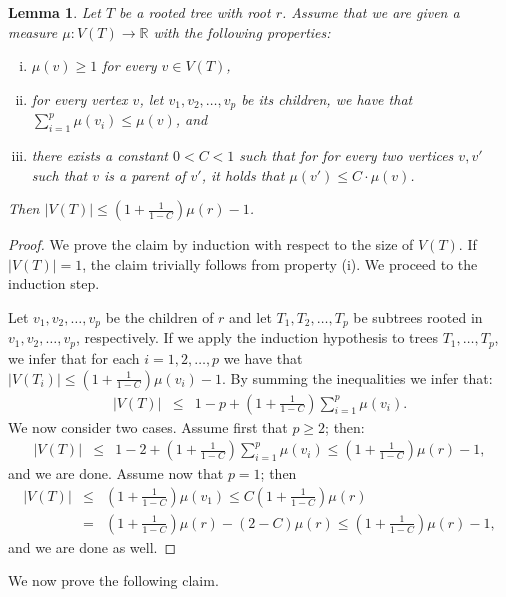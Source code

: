 \documentclass[a4paper,11pt]{article}
\newtheorem{lemma}{Lemma}[section]
\theoremstyle{definition}
\theoremstyle{remark}
\newcommand{\R}{\mathbb{R}}
\begin{document}
\begin{lemma}
  \label{lemma:bounded-tree}
  Let $T$ be a rooted tree with root $r$.  Assume that we are given a
  measure $\mu:V(T)\to \R$ with the following properties:
  \begin{enumerate}[(i)]
  \item[(i)] $\mu(v)\geq 1$ for every $v\in V(T)$,
  \item[(ii)] for every vertex $v$, let $v_1,v_2,\ldots,v_p$ be its
    children, we have that $\sum_{i=1}^p \mu(v_i)\leq \mu(v)$, and
  \item[(iii)] there exists a constant $0<C<1$ such that for for every
    two vertices $v,v'$ such that $v$ is a parent of $v'$, it holds
    that $\mu(v')\leq C\cdot \mu(v)$.
  \end{enumerate}
  Then $|V(T)|\leq \left(1+\frac{1}{1-C}\right)\mu(r)-1$.
\end{lemma}
\begin{proof}
  We prove the claim by induction with respect to the size of $V(T)$.
  If $|V(T)|=1$, the claim trivially follows from property (i).  We
  proceed to the induction step.
  
  Let $v_1,v_2,\ldots,v_p$ be the children of $r$ and let
  $T_1,T_2,\ldots,T_p$ be subtrees rooted in $v_1,v_2,\ldots,v_p$,
  respectively.  If we apply the induction hypothesis to trees
  $T_1,\ldots,T_p$, we infer that for each $i=1,2,\ldots,p$ we have
  that $|V(T_i)| \leq \left(1+\frac{1}{1-C}\right)\mu(v_i)-1$.  By
  summing the inequalities we infer that:
  \begin{eqnarray*}
    |V(T)|& \leq & 1-p+\left(1+\frac{1}{1-C}\right)\sum_{i=1}^p \mu(v_i).
  \end{eqnarray*}
  We now consider two cases.  Assume first that $p\geq 2$; then:
  \begin{eqnarray*}
    |V(T)|& \leq & 1-2+\left(1+\frac{1}{1-C}\right)\sum_{i=1}^p \mu(v_i)\leq
    \left(1+\frac{1}{1-C}\right)\mu(r)-1,
  \end{eqnarray*}
  and we are done.  Assume now that $p=1$; then
  \begin{eqnarray*}
    |V(T)| & \leq & \left(1+\frac{1}{1-C}\right)\mu(v_1) \leq
    C\left(1+\frac{1}{1-C}\right)\mu(r)\\
    & = & \left(1+\frac{1}{1-C}\right)\mu(r)-(2-C)\mu(r) \leq
    \left(1+\frac{1}{1-C}\right)\mu(r)-1, 
  \end{eqnarray*}
  and we are done as well.
\end{proof}

We now prove the following claim.
\end{document}
